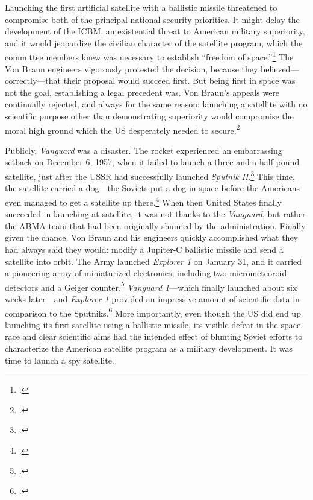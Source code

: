 \documentclass[14pt]{extarticle}
\begin{document}
Launching the first artificial satellite with a ballistic missile threatened to compromise both of the principal national security priorities. It might delay the development of the ICBM, an existential threat to American military superiority, and it would jeopardize the civilian character of the satellite program, which the committee members knew was necessary to establish ``freedom of space.''\footcite[p.~122]{mcdougall_heavens_1985} The Von Braun engineers vigorously protested the decision, because they believed---correctly---that their proposal would succeed first. But being first in space was not the goal, establishing a legal precedent was. Von Braun's appeals were continually rejected, and always for the same reason: launching a satellite with no scientific purpose other than demonstrating superiority would compromise the moral high ground which the US desperately needed to secure.\footcite[p.~131]{day_eye_2015}

Publicly, \emph{Vanguard} was a disaster. The rocket experienced an embarrassing setback on December 6, 1957, when it failed to launch a three-and-a-half pound satellite, just after the USSR had successfully launched \emph{Sputnik II}.\footcite[p.~119]{killian_sputnik_1977} This time, the satellite carried a dog---the Soviets put a dog in space before the Americans even managed to get a satellite up there.\footcite[Her name was Laika.]{george_sad_2018} When then United States finally succeeded in launching at satellite, it was not thanks to the \emph{Vanguard}, but rather the ABMA team that had been originally shunned by the administration. Finally given the chance, Von Braun and his engineers quickly accomplished what they had always said they would: modify a Jupiter-C ballistic missile and send a satellite into orbit. The Army launched \emph{Explorer 1} on January 31, and it carried a pioneering array of miniaturized electronics, including two micrometeoroid detectors and a Geiger counter.\footcite[p.~168]{mcdougall_heavens_1985} \emph{Vanguard 1}---which finally launched about six weeks later---and \emph{Explorer 1} provided an impressive amount of scientific data in comparison to the Sputniks.\footcite[p.~168]{mcdougall_heavens_1985} More importantly, even though the US did end up launching its first satellite using a ballistic missile, its visible defeat in the space race and clear scientific aims had the intended effect of blunting Soviet efforts to characterize the American satellite program as a military development. It was time to launch a spy satellite.
\end{document}
